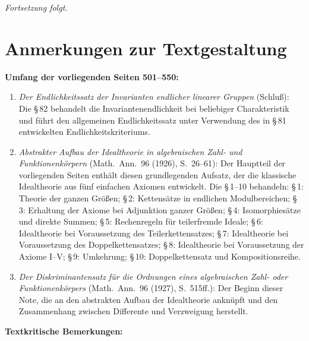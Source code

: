 \documentclass[12pt,a4paper]{article}
\theoremstyle{plain}
\theoremstyle{definition}
\theoremstyle{remark}
\begin{document}
\vspace{0.5cm}
\noindent
\textit{Fortsetzung folgt.}

\newpage
\section*{Anmerkungen zur Textgestaltung}

\noindent

\medskip
\noindent
\textbf{Umfang der vorliegenden Seiten 501--550:}

\begin{enumerate}
    \item \textit{Der Endlichkeitssatz der Invarianten endlicher linearer Gruppen} (Schluß): Die \S\,82 behandelt die Invariantenendlichkeit bei beliebiger Charakteristik und führt den allgemeinen Endlichkeitssatz unter Verwendung des in \S\,81 entwickelten Endlichkeitskriteriums.
    
    \item \textit{Abstrakter Aufbau der Idealtheorie in algebraischen Zahl- und Funktionenkörpern} (Math.\ Ann.\ 96 (1926), S.~26--61): Der Hauptteil der vorliegenden Seiten enthält diesen grundlegenden Aufsatz, der die klassische Idealtheorie aus fünf einfachen Axiomen entwickelt. Die \S\,1--10 behandeln: \S\,1: Theorie der ganzen Größen; \S\,2: Kettensätze in endlichen Modulbereichen; \S\,3: Erhaltung der Axiome bei Adjunktion ganzer Größen; \S\,4: Isomorphiesätze und direkte Summen; \S\,5: Rechenregeln für teilerfremde Ideale; \S\,6: Idealtheorie bei Voraussetzung des Teilerkettensatzes; \S\,7: Idealtheorie bei Voraussetzung des Doppelkettensatzes; \S\,8: Idealtheorie bei Voraussetzung der Axiome I--V; \S\,9: Umkehrung; \S\,10: Doppelkettensatz und Kompositionsreihe.
    
    \item \textit{Der Diskriminantensatz für die Ordnungen eines algebraischen Zahl- oder Funktionenkörpers} (Math.\ Ann.\ 96 (1927), S.~515ff.): Der Beginn dieser Note, die an den abstrakten Aufbau der Idealtheorie anknüpft und den Zusammenhang zwischen Differente und Verzweigung herstellt.
\end{enumerate}

\medskip
\noindent
\textbf{Textkritische Bemerkungen:}
\end{document}
